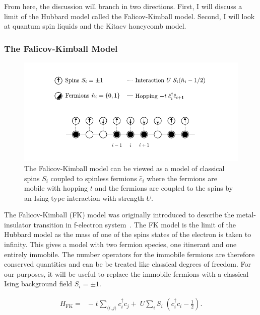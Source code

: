 From here, the discussion will branch in two directions. First, I will discuss a limit of the Hubbard model called the Falicov-Kimball model. Second, I will look at quantum spin liquids and the Kitaev honeycomb model.

\hypertarget{intro-the-fk-model}{%
\subsubsection{The Falicov-Kimball Model}\label{intro-the-fk-model}}

\hypertarget{fig:fk_schematic}{%
\begin{figure}
\centering
\includegraphics[width=1\textwidth,height=\textheight]{figure_code/intro_chapter/fk_schematic}
\caption[{Falicov-Kimball Model Diagram}]{The Falicov-Kimball model can be viewed as a model of classical spins \(S_i\) coupled to spinless fermions \(\hat{c}_i\) where the fermions are mobile with hopping \(t\) and the fermions are coupled to the spins by an Ising type interaction with strength \(U\).}
\label{fig:fk_schematic}
\end{figure}
}

The Falicov-Kimball (FK) model was originally introduced to describe the metal-insulator transition in f-electron system~\autocite{hubbardj.ElectronCorrelationsNarrow1963,falicovSimpleModelSemiconductorMetal1969}. The FK model is the limit of the Hubbard model as the mass of one of the spins states of the electron is taken to infinity. This gives a model with two fermion species, one itinerant and one entirely immobile. The number operators for the immobile fermions are therefore conserved quantities and can be be treated like classical degrees of freedom. For our purposes, it will be useful to replace the immobile fermions with a classical Ising background field \(S_i = \pm1\).

\[\begin{aligned}
H_{\mathrm{FK}} = & -\;t \sum_{\langle i,j \rangle} c^\dagger_{i}c_{j} + \;U \sum_{i} S_i\;(c^\dagger_{i}c_{i} - \tfrac{1}{2}). \\ 
\end{aligned}\]

